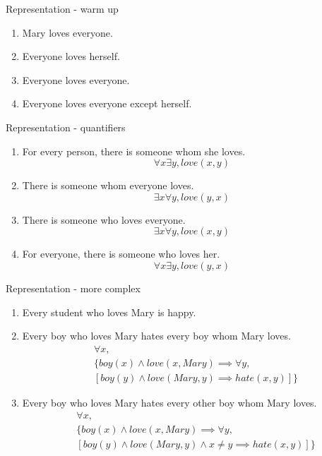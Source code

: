 \documentclass{beamer}
\begin{document}
\begin{frame}{Representation - warm up}
\begin{enumerate}
	\item Mary loves everyone.
	\item Everyone loves herself.
	\item Everyone loves everyone.
	\item Everyone loves everyone except herself.
\end{enumerate}
\end{frame}

\begin{frame}{Representation - quantifiers}
\begin{enumerate}
	\item For every person, there is someone whom she loves.
	\pause
	\[
	\forall x \exists y, love(x,y)
	\]
	\item There is someone whom everyone loves.
	\pause
	\[
	\exists x \forall y, love(y,x)
	\]
	\item There is someone who loves everyone.
	\pause
	\[
	\exists x \forall y, love(x, y)
	\]
	\item For everyone, there is someone who loves her.
	\pause
	\[
	\forall x \exists y, love(y, x)
	\]
\end{enumerate}
\end{frame}





\begin{frame}{Representation - more complex}
\begin{enumerate}
	\item Every student who loves Mary is happy.
	\item Every boy who loves Mary hates every boy whom Mary loves.
	\pause
	\[
	\begin{split}
		&\forall x, \\
		& \{boy(x) \land love(x, Mary) \implies \forall y, \\
		& [boy(y) \land love(Mary, y) \implies hate(x,y)]\}
	\end{split}
	\]
	\item Every boy who loves Mary hates every other boy whom Mary loves.
	\pause
	\[
	\begin{split}
		&\forall x, \\
		& \{boy(x) \land love(x, Mary) \implies \forall y, \\
		& [boy(y) \land love(Mary, y) \land x\neq y \implies hate(x,y)]\} 
	\end{split}
	\]
\end{enumerate}
\end{frame}
\end{document}
